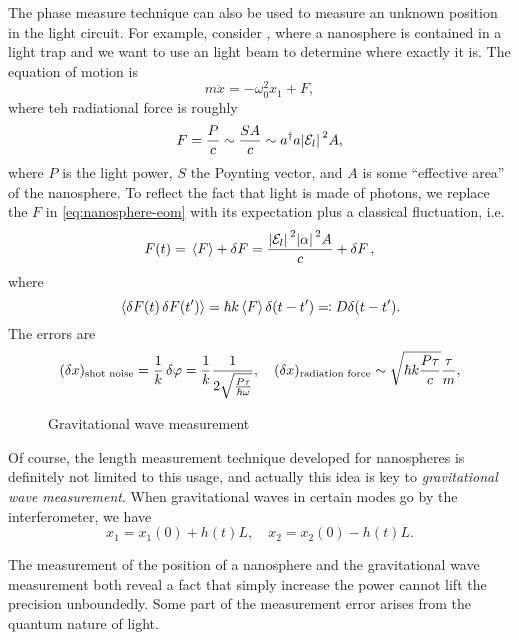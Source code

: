\documentclass[hyperref, a4paper]{article}
\begin{document}
The phase measure technique can also be used to measure an unknown position in the light circuit.
For example, consider , where a nanosphere is contained in a light trap and we want to use an light beam to determine where exactly it is.
The equation of motion is 
\begin{equation}
    m \ddot{x} = - \omega_0^2 x_1 + F,
    \label{eq:nanosphere-eom}
\end{equation}
where teh radiational force is roughly
\begin{equation}
    F = \frac{P}{c} \sim \frac{SA}{c} \sim a^\dagger a \abs*{\mathcal{E}_l}^2 A,
\end{equation}
where $P$ is the light power, $S$ the Poynting vector, and $A$ is some ``effective area'' of the nanosphere.
To reflect the fact that light is made of photons, we replace the $F$ in \eqref{eq:nanosphere-eom} with its expectation plus a classical fluctuation, i.e.
\begin{equation}
    F(t) = \expval*{F} + \var{F} = \frac{\abs*{\mathcal{E}_l}^2 \abs*{\alpha}^2 A}{c} + \var{F},
\end{equation}
where 
\begin{equation}
    \expval*{\var{F(t)} \var{F(t')}} = \hbar k \expval*{F} \delta(t - t') \eqqcolon D \delta(t - t').
\end{equation}
The errors are
\begin{equation}
    (\var{x})_\text{shot noise} = \frac{1}{k} \var{\varphi} = \frac{1}{k} \frac{1}{2 \sqrt{\frac{P \tau}{\hbar \omega}}} , \quad (\var{x})_\text{radiation force} \sim \sqrt{\hbar k \frac{P \tau}{c}} \frac{\tau}{m}, 
\end{equation}

\begin{figure}
    \centering
    
    \caption{Gravitational wave measurement}
\end{figure}

Of course, the length measurement technique developed for nanospheres is definitely not limited to this usage, and actually this idea is key to \emph{gravitational wave measurement}.
When gravitational waves in certain modes go by the interferometer, we have 
\begin{equation}
    x_1 = x_1(0) + h(t) L, \quad x_2 = x_2(0) - h(t) L.
\end{equation}

The measurement of the position of a nanosphere and the gravitational wave measurement both reveal a fact that simply increase the power cannot lift the precision unboundedly. 
Some part of the measurement error arises from the quantum nature of light.
\end{document}
